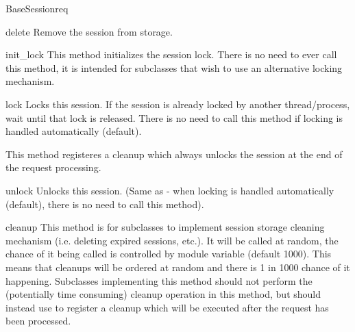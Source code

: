 \begin{classdesc}{BaseSession}{req}
  \begin{methoddesc}[BaseSession]{delete}{}
    Remove the session from storage.
  \end{methoddesc}

  \begin{methoddesc}[BaseSession]{init_lock}{}
    This method initializes the session lock. There is no need to ever
    call this method, it is intended for subclasses that wish to use
    an alternative locking mechanism.
  \end{methoddesc}

  \begin{methoddesc}[BaseSession]{lock}{}
    Locks this session. If the session is already locked by another
    thread/process, wait until that lock is released. There is no need
    to call this method if locking is handled automatically (default).

    This method registeres a cleanup which always unlocks the session
    at the end of the request processing.
  \end{methoddesc}

  \begin{methoddesc}[BaseSession]{unlock}{}
    Unlocks this session. (Same as  - when locking is
    handled automatically (default), there is no need to call this
    method).
  \end{methoddesc}

  \begin{methoddesc}[BaseSession]{cleanup}{}
    This method is for subclasses to implement session storage
    cleaning mechanism (i.e. deleting expired sessions, etc.). It will
    be called at random, the chance of it being called is controlled
    by   module variable
    (default 1000). This means that cleanups will be ordered at random
    and there is 1 in 1000 chance of it happening. Subclasses
    implementing this method should not perform the (potentially time
    consuming) cleanup operation in this method, but should instead
    use  to register a cleanup which will
    be executed after the request has been processed.
  \end{methoddesc}

\end{classdesc}

